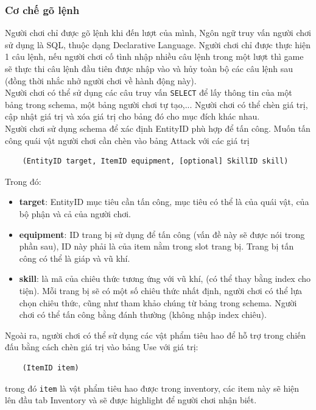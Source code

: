 \subsubsection{Cơ chế gõ lệnh}
\hspace*{1cm}Người chơi chỉ được gõ lệnh khi đến lượt của mình, Ngôn ngữ truy vấn người chơi sử dụng là SQL, thuộc dạng Declarative Language. Người chơi chỉ được thực hiện 1 câu lệnh, nếu người chơi cố tình nhập nhiều câu lệnh trong một lượt thì game sẽ thực thi câu lệnh đầu tiên được nhập vào và hủy toàn bộ các câu lệnh sau (đồng thời nhắc nhở người chơi về hành động này).\\
\hspace*{1cm} Người chơi có thể sử dụng các câu truy vấn \texttt{SELECT} để lấy thông tin của một bảng trong schema, một bảng người chơi tự tạo,... Người chơi có thể chèn giá trị, cập nhật giá trị và xóa giá trị cho bảng đó cho mục đích khác nhau.\\
\hspace*{1cm} Người chơi sử dụng schema để xác định EntityID phù hợp để tấn công. Muốn tấn công quái vật người chơi cần chèn vào bảng Attack với các giá trị 
\begin{verbatim}
	(EntityID target, ItemID equipment, [optional] SkillID skill)
\end{verbatim}
Trong đó:
\begin{itemize}
	\item \textbf{target}: EntityID mục tiêu cần tấn công, mục tiêu có thể là của quái vật, của bộ phận và cả của người chơi.
	\item \textbf{equipment}: ID trang bị sử dụng để tấn công (vấn đề này sẽ được nói trong phần sau), ID này phải là của item nằm trong slot trang bị. Trang bị tấn công có thể là giáp và vũ khí.
	\item \textbf{skill}: là mã của chiêu thức tương ứng với vũ khí, (có thể thay bằng index cho tiện). Mỗi trang bị sẽ có một số chiêu thức nhất định, người chơi có thể lựa chọn chiêu thức, cũng như tham khảo chúng từ bảng trong schema. Người chơi có thể tấn công bằng đánh thường (không nhập index chiêu).
\end{itemize}

Ngoài ra, người chơi có thể sử dụng các vật phẩm tiêu hao để hỗ trợ trong chiến đấu bằng cách chèn giá trị vào bảng Use với giá trị:
\begin{verbatim}
	(ItemID item)
\end{verbatim}
trong đó \texttt{item} là vật phẩm tiêu hao được trong inventory, các item này sẽ hiện lên đầu tab Inventory và sẽ được highlight để người chơi nhận biết.
